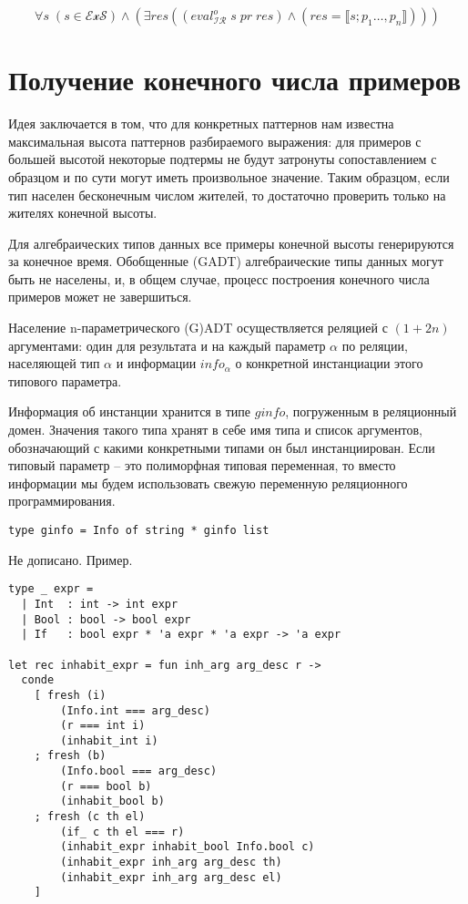 \documentclass[a5paper,12pt]{article}
\newcommand{\sem}[1]{\llbracket #1 \rrbracket}
\newcommand{\ir}{\ensuremath{\mathcal{I\!R}}}
\begin{document}
$$
\forall s \; (s\in\mathcal{ExS})\land \left(\exists res \left((eval^o_{\ir}\; s \; pr \; res) \land ( res = \sem{s;p_1\dots,p_n}) \right)\right)
$$

\section{Получение конечного числа примеров}
\label{genexamples}

Идея заключается в том, что для конкретных паттернов нам известна максимальная высота паттернов разбираемого выражения: для примеров с большей высотой некоторые подтермы не будут затронуты сопоставлением с образцом и по сути могут иметь произвольное значение. Таким образцом, если тип населен бесконечным числом жителей, то достаточно проверить только на жителях конечной высоты.

Для алгебраических типов данных все примеры конечной высоты генерируются за конечное время. Обобщенные (GADT) алгебраические типы данных могут быть не населены, и, в общем случае, процесс построения конечного числа примеров может не завершиться.

Население n-параметрического (G)ADT осуществляется реляцией с $(1+2n)$ аргументами: один для результата и на каждый параметр $\alpha$ по реляции, населяющей тип $\alpha$ и информации $info_{\alpha}$ о конкретной инстанциации этого типового параметра.

Информация об инстанции хранится в типе $ginfo$, погруженным в реляционный домен. Значения такого типа хранят в себе имя типа и список аргументов, обозначающий с какими конкретными типами он был инстанциирован. Если типовый параметр -- это полиморфная типовая переменная, то вместо информации мы будем использовать свежую переменную реляционного программирования.

\begin{verbatim}
type ginfo = Info of string * ginfo list
\end{verbatim}

Не дописано. Пример.

\begin{verbatim}
type _ expr =
  | Int  : int -> int expr
  | Bool : bool -> bool expr
  | If   : bool expr * 'a expr * 'a expr -> 'a expr
  
let rec inhabit_expr = fun inh_arg arg_desc r ->
  conde
    [ fresh (i)
        (Info.int === arg_desc)
        (r === int i)
        (inhabit_int i)
    ; fresh (b)
        (Info.bool === arg_desc)
        (r === bool b)
        (inhabit_bool b)
    ; fresh (c th el)
        (if_ c th el === r)
        (inhabit_expr inhabit_bool Info.bool c)
        (inhabit_expr inh_arg arg_desc th)
        (inhabit_expr inh_arg arg_desc el)
    ]
\end{verbatim}
\end{document}
